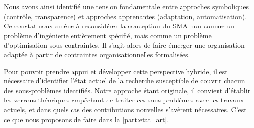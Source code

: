 Nous avons ainsi identifié une tension fondamentale entre approches symboliques (contrôle, transparence) et approches apprenantes (adaptation, automatisation). Ce constat nous amène à reconsidérer la conception du \ac{SMA} non comme un problème d'ingénierie entièrement spécifié, mais comme un problème d'optimisation sous contraintes. Il s'agit alors de faire émerger une organisation adaptée à partir de contraintes organisationnelles formalisées.

Pour pouvoir prendre appui et développer cette perspective hybride, il est nécessaire d'identifier l'état actuel de la recherche susceptible de couvrir chacun des sous-problèmes identifiés. Notre approche étant originale, il convient d'établir les verrous théoriques empêchant de traiter ces sous-problèmes avec les travaux actuels, et dans quels cas des contributions nouvelles s'avèrent nécessaires. C'est ce que nous proposons de faire dans la \autoref{part:etat_art}.